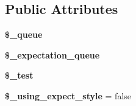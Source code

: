 \subsection*{Public Attributes}
\begin{DoxyCompactItemize}
\item 
\hypertarget{class_simple_error_queue_a22fe32f7784338b6ee61cfe79dffd3e4}{
{\bfseries \$\_\-queue}}
\label{class_simple_error_queue_a22fe32f7784338b6ee61cfe79dffd3e4}

\item 
\hypertarget{class_simple_error_queue_a42f5cf9b5f1e7d8293e42511c4e4a77b}{
{\bfseries \$\_\-expectation\_\-queue}}
\label{class_simple_error_queue_a42f5cf9b5f1e7d8293e42511c4e4a77b}

\item 
\hypertarget{class_simple_error_queue_a08926c6ef8cc99bbc78be539271b9177}{
{\bfseries \$\_\-test}}
\label{class_simple_error_queue_a08926c6ef8cc99bbc78be539271b9177}

\item 
\hypertarget{class_simple_error_queue_a38d4321c56d6d690124b62838939901e}{
{\bfseries \$\_\-using\_\-expect\_\-style} = false}
\label{class_simple_error_queue_a38d4321c56d6d690124b62838939901e}

\end{DoxyCompactItemize}


